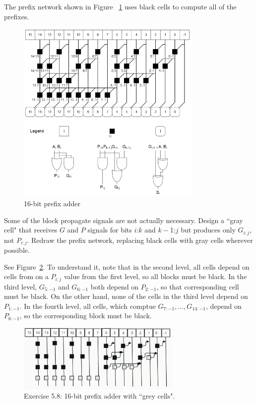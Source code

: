 \documentclass[12pt]{article}
\newenvironment{ex}[2][Exercise]{\begin{trivlist}
		\item[\hskip \labelsep {\bfseries #1}\hskip \labelsep {\bfseries #2.}]}{\end{trivlist}}
\newenvironment{sol}[1][Solution]{\begin{trivlist}
		\item[\hskip \labelsep {\bfseries #1:}]}{\end{trivlist}}
\begin{document}
\begin{ex}{5.5}
	The prefix network shown in Figure ~\ref{16-bit-prefix-adder-schematic} uses black cells to compute all of the
	prefixes.
	\begin{figure}
		\centering
		\includegraphics[width=0.8\textwidth]{16-bit-prefix-adder-schematic}
		\caption{16-bit prefix adder}
		\label{16-bit-prefix-adder-schematic}
	\end{figure}
	
	Some of the block propagate signals are not actually necessary. Design a
	``gray cell" that receives $G$ and $P$ signals for bits $i$:$k$ and $k-$1:$j$ but
	produces only $G_{i:j}$, not $P_{i:j}$. Redraw the prefix network, replacing black
	cells with gray cells wherever possible.
\end{ex}

\begin{sol}
	See Figure~\ref{16-bit-prefix-adder-grey-cells}. To understand it, note that
	in the second level, all cells depend on cells from on a $P_{i:j}$ value
	from the first level, so all blocks must be black.
	In the third level, $G_{5:-1}$ and $G_{6:-1}$ both depend on $P_{2:-1}$, so
	that corresponding cell must be black. On the other hand, none of the cells
	in the third level depend on $P_{1:-1}$. In the fourth level,
	all cells, which comptue $G_{7:-1},\ldots, G_{14:-1}$, depend on $P_{6:-1}$,
	so the corresponding block must be black.
	\begin{figure}
		\centering
		\includegraphics[width=0.7\textwidth]{16-bit-prefix-adder-grey-cells}
		\caption{Exercise 5.8: 16-bit prefix adder with ``grey cells".}
		\label{16-bit-prefix-adder-grey-cells}
	\end{figure}
\end{sol}
\end{document}
